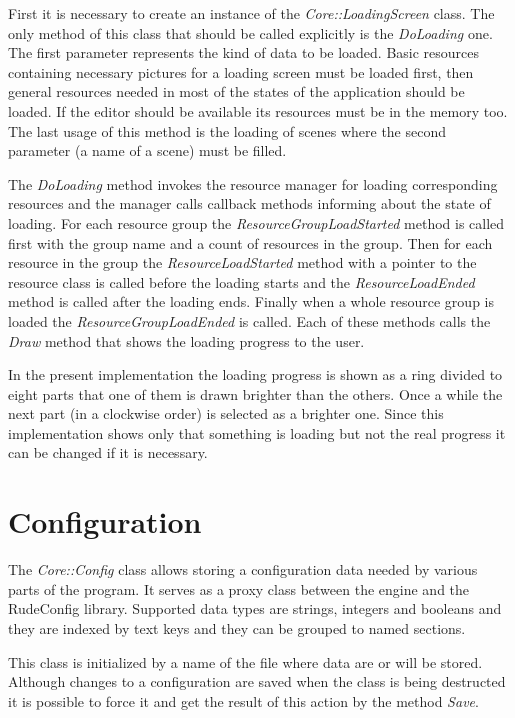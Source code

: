 \documentclass[a4paper, 12pt]{report}
\begin{document}
First it is necessary to create an instance of the \emph{Core::LoadingScreen} class. The only method of this class that should be called explicitly is the \emph{DoLoading} one. The first parameter represents the kind of data to be loaded. Basic resources containing necessary pictures for a loading screen must be loaded first, then general resources needed in most of the states of the application should be loaded. If the editor should be available its resources must be in the memory too. The last usage of this method is the loading of scenes where the second parameter (a name of a scene) must be filled.

The \emph{DoLoading} method invokes the resource manager for loading corresponding resources and the manager calls callback methods informing about the state of loading. For each resource group the \emph{ResourceGroupLoadStarted} method is called first with the group name and a count of resources in the group. Then for each resource in the group the \emph{ResourceLoadStarted} method with a pointer to the resource class is called before the loading starts and the \emph{ResourceLoadEnded} method is called after the loading ends. Finally when a whole resource group is loaded the \emph{ResourceGroupLoadEnded} is called. Each of these methods calls the \emph{Draw} method that shows the loading progress to the user.

In the present implementation the loading progress is shown as a ring divided to eight parts that one of them is drawn brighter than the others. Once a while the next part (in a clockwise order) is selected as a brighter one. Since this implementation shows only that something is loading but not the real progress it can be changed if it is necessary.

\section{Configuration}
\label{sec:config}

The \emph{Core::Config} class allows storing a configuration data needed by various parts of the program. It serves as a proxy class between the engine and the RudeConfig library\cite{rudeconfig}. Supported data types are strings, integers and booleans and they are indexed by text keys and they can be grouped to named sections.

This class is initialized by a name of the file where data are or will be stored. Although changes to a configuration are saved when the class is being destructed it is possible to force it and get the result of this action by the method \emph{Save}.
\end{document}
